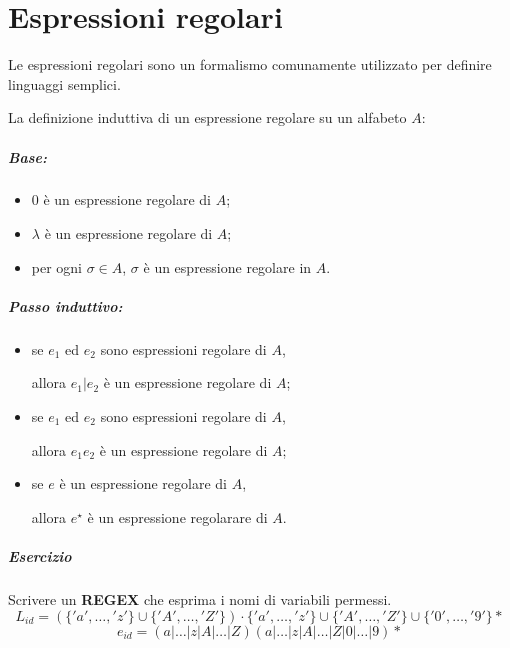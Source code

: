\chapter{Espressioni regolari}
Le espressioni regolari sono un formalismo comunamente utilizzato per
definire linguaggi semplici.

\begin{theorem}
  La definizione induttiva di un espressione regolare su un alfabeto $A$:
  \paragraph{Base:}
  \begin{itemize}
    \item $0$ è un espressione regolare di $A$;
    \item $\lambda$ è un espressione regolare di $A$;
    \item per ogni $\sigma\in A$, $\sigma$ è un espressione regolare
      in $A$.
  \end{itemize}
  
  \paragraph{Passo induttivo:}
  \begin{itemize}
    \item se $e_1$ ed $e_2$ sono espressioni regolare di $A$,

      allora $e_1|e_2$ è un espressione regolare di $A$;
    \item se $e_1$ ed $e_2$ sono espressioni regolare di $A$,

      allora $e_1 e_2$ è un espressione regolare di $A$;
    \item se $e$ è un espressione regolare di $A$,

      allora $e^\star$ è un espressione regolarare di $A$.
  \end{itemize}
\end{theorem}

\paragraph{Esercizio}
Scrivere un \textbf{REGEX} che esprima i nomi di variabili permessi.
\[
  L_{id} = (\{'a',\dots,'z'\}\cup\{'A',\dots,'Z'\})\cdot
    \{'a',\dots,'z'\}\cup\{'A',\dots,'Z'\}\cup\{'0',\dots,'9'\}*
\]
\[
  e_{id}=(a|\dots|z|A|\dots|Z)(a|\dots|z|A|\dots|Z|0|\dots|9)*
\]

